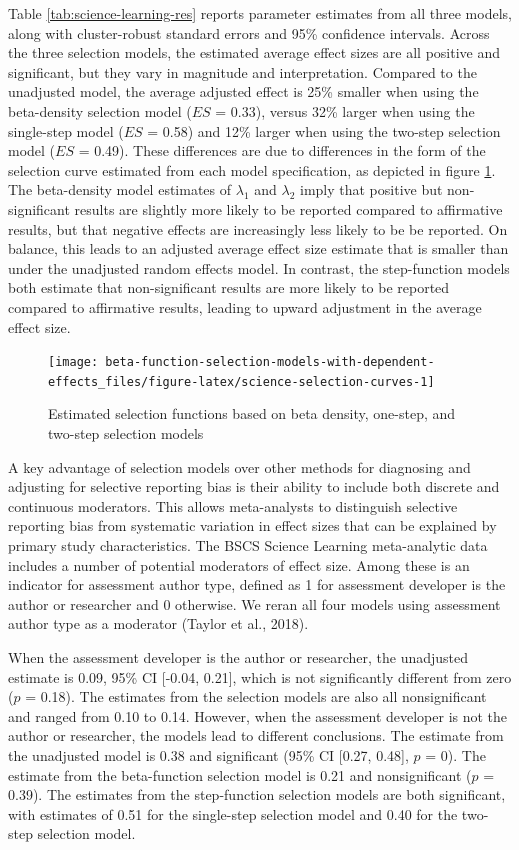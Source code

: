 \documentclass[
  american,
  man, donotrepeattitle,floatsintext]{apa7}
\begin{document}
Table \ref{tab:science-learning-res} reports parameter estimates from all three models, along with cluster-robust standard errors and 95\% confidence intervals.
Across the three selection models, the estimated average effect sizes are all positive and significant, but they vary in magnitude and interpretation. Compared to the unadjusted model, the average adjusted effect is 25\% smaller when using the beta-density selection model (\(ES\) = 0.33), versus 32\% larger when using the single-step model (\(ES\) = 0.58) and 12\% larger when using the two-step selection model (\(ES\) = 0.49).
These differences are due to differences in the form of the selection curve estimated from each model specification, as depicted in figure \ref{fig:science-selection-curves}.
The beta-density model estimates of \(\lambda_1\) and \(\lambda_2\) imply that positive but non-significant results are slightly more likely to be reported compared to affirmative results, but that negative effects are increasingly less likely to be be reported.
On balance, this leads to an adjusted average effect size estimate that is smaller than under the unadjusted random effects model.
In contrast, the step-function models both estimate that non-significant results are more likely to be reported compared to affirmative results, leading to upward adjustment in the average effect size.

\begin{figure}[tb]
\texttt{[image: beta-function-selection-models-with-dependent-effects\_files/figure-latex/science-selection-curves-1]} \caption{Estimated selection functions based on beta density, one-step, and two-step selection models}\label{fig:science-selection-curves}
\end{figure}

A key advantage of selection models over other methods for diagnosing and adjusting for selective reporting bias is their ability to include both discrete and continuous moderators. This allows meta-analysts to distinguish selective reporting bias from systematic variation in effect sizes that can be explained by primary study characteristics. The BSCS Science Learning meta-analytic data includes a number of potential moderators of effect size. Among these is an indicator for assessment author type, defined as 1 for assessment developer is the author or researcher and 0 otherwise. We reran all four models using assessment author type as a moderator (Taylor et al., 2018).

When the assessment developer is the author or researcher, the unadjusted estimate is 0.09, 95\% CI {[}-0.04, 0.21{]}, which is not significantly different from zero (\(p\) = 0.18). The estimates from the selection models are also all nonsignificant and ranged from 0.10 to 0.14. However, when the assessment developer is not the author or researcher, the models lead to different conclusions. The estimate from the unadjusted model is 0.38 and significant (95\% CI {[}0.27, 0.48{]}, \(p\) = 0). The estimate from the beta-function selection model is 0.21 and nonsignificant (\(p\) = 0.39). The estimates from the step-function selection models are both significant, with estimates of 0.51 for the single-step selection model and 0.40 for the two-step selection model.
\end{document}
